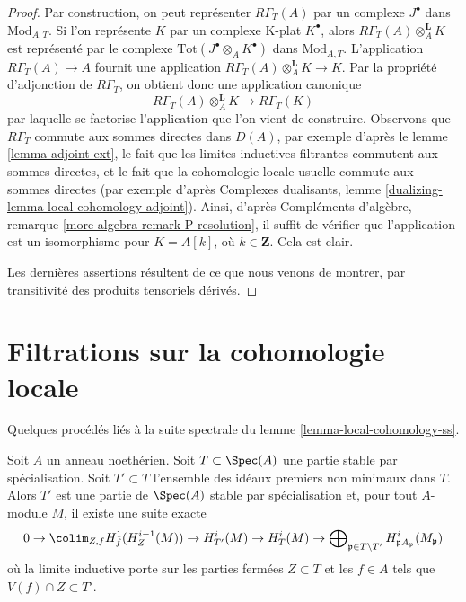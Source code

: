 \begin{proof}
Par construction, on peut représenter $R\Gamma_T(A)$ par un complexe $J^\bullet$ dans $\text{Mod}_{A, T}$. Si l'on représente $K$ par un complexe K-plat $K^\bullet$, alors $R\Gamma_T(A) \otimes_A^\mathbf{L} K$ est représenté par le complexe $\text{Tot}(J^\bullet \otimes_A K^\bullet)$ dans $\text{Mod}_{A, T}$. L'application $R\Gamma_T(A) \to A$ fournit une application $R\Gamma_T(A) \otimes_A^\mathbf{L} K\to K$. Par la propriété d'adjonction de $R\Gamma_T$, on obtient donc une application canonique
$$
R\Gamma_T(A) \otimes_A^\mathbf{L} K \longrightarrow R\Gamma_T(K)
$$
par laquelle se factorise l'application que l'on vient de construire. Observons que $R\Gamma_T$ commute aux sommes directes dans $D(A)$, par exemple d'après le lemme \ref{lemma-adjoint-ext}, le fait que les limites inductives filtrantes commutent aux sommes directes, et le fait que la cohomologie locale usuelle commute aux sommes directes (par exemple d'après Complexes dualisants, lemme \ref{dualizing-lemma-local-cohomology-adjoint}). Ainsi, d'après Compléments d'algèbre, remarque \ref{more-algebra-remark-P-resolution}, il suffit de vérifier que l'application est un isomorphisme pour $K = A[k]$, où $k \in \mathbf{Z}$. Cela est clair.

\medskip\noindent
Les dernières assertions résultent de ce que nous venons de montrer, par transitivité des produits tensoriels dérivés.
\end{proof}





\section{Filtrations sur la cohomologie locale}
\label{section-filter-local-cohomology}

\noindent
Quelques procédés liés à la suite spectrale du lemme \ref{lemma-local-cohomology-ss}.

\begin{lemma}
\label{lemma-filter-local-cohomology}
Soit $A$ un anneau noethérien. Soit $T \subset \Spec(A)$ une partie stable par spécialisation. Soit $T' \subset T$ l'ensemble des idéaux premiers non minimaux dans $T$. Alors $T'$ est une partie de $\Spec(A)$ stable par spécialisation et, pour tout $A$-module $M$, il existe une suite exacte
$$
0 \to
\colim_{Z, f} H^1_f(H^{i - 1}_Z(M)) \to
H^i_{T'}(M) \to H^i_T(M) \to
\bigoplus\nolimits_{\mathfrak p \in T \setminus T'}
H^i_{\mathfrak p A_\mathfrak p}(M_\mathfrak p)
$$
où la limite inductive porte sur les parties fermées $Z \subset T$ et les $f \in A$ tels que $V(f) \cap Z \subset T'$.
\end{lemma}

